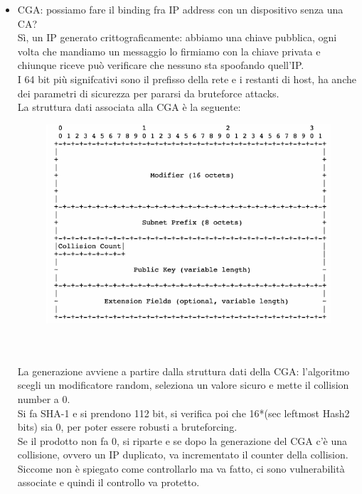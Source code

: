 \documentclass[12pt, oneside]{extbook} %
\begin{document}
    \begin{itemize}
        \item CGA: possiamo fare il binding fra IP address con un dispositivo senza una CA?
        \\Sì, un IP generato crittograficamente: abbiamo una chiave pubblica, ogni volta che mandiamo un messaggio lo firmiamo con la chiave privata e chiunque riceve può verificare che nessuno  sta spoofando quell'IP.
        \\I 64 bit più signifcativi sono il prefisso della rete e i restanti di host, ha anche dei parametri di sicurezza per pararsi da bruteforce attacks.
        \\La struttura dati associata alla CGA è la seguente:\\
            \begin{figure}[h!]
            \centering
            \includegraphics[scale=0.4]{../../immagini/cga_struct.png}
        \end{figure}\\\\
        La generazione avviene a partire dalla struttura dati della CGA: l'algoritmo scegli un modificatore random, seleziona un valore sicuro e mette il collision number a 0.
        \\Si fa SHA-1 e si prendono 112 bit, si verifica poi che 16*(sec leftmost Hash2 bits) sia 0, per poter essere robusti a bruteforcing.
        \\Se il prodotto non fa 0, si riparte e se dopo la generazione del CGA c'è una collisione, ovvero un IP duplicato, va incrementato il counter della collision.
        \\Siccome non è spiegato come controllarlo ma va fatto, ci sono vulnerabilità associate e quindi il controllo va protetto.

\end{itemize}
\end{document}
